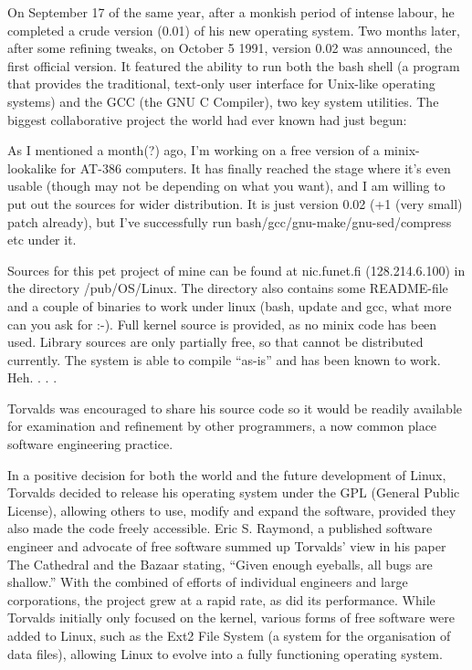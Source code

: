 \documentclass{article}
\begin{document}
On September 17 of the same year, after a monkish period of intense labour, he completed a crude version (0.01) of his new operating system. Two months later, after some refining tweaks, on October 5 1991, version 0.02 was announced, the first official version. It featured the ability to run both the bash shell (a program that provides the traditional, text-only user interface for Unix-like operating systems) and the GCC (the GNU C Compiler), two key system utilities. The biggest collaborative project the world had ever known had just begun: \newline 

As I mentioned a month(?) ago, I'm working on a free version of a minix-lookalike for AT-386 computers. It has finally reached the stage where it's even usable (though may not be depending on what you want), and I am willing to put out the sources for wider distribution. It is just version 0.02 (+1 (very small) patch already), but I've successfully run bash/gcc/gnu-make/gnu-sed/compress etc under it. 

Sources for this pet project of mine can be found at nic.funet.fi (128.214.6.100) in the directory /pub/OS/Linux. The directory also contains some README-file and a couple of binaries to work under linux (bash, update and gcc, what more can you ask for :-). Full kernel source is provided, as no minix code has been used. Library sources are only partially free, so that cannot be distributed currently. The system is able to compile ``as-is'' and has been known to work. Heh. . . . \cite{kernel} \newline 

Torvalds was encouraged to share his source code so it would be readily available for examination and refinement by other programmers, a now common place software engineering practice.  \newline \newline

In a positive decision for both the world and the future development of Linux, Torvalds decided to release his operating system under the GPL (General Public License), allowing others to use, modify and expand the software, provided they also made the code freely accessible. Eric S. Raymond, a published software engineer and advocate of free software summed up Torvalds’ view in his paper The Cathedral and the Bazaar stating, ``Given enough eyeballs, all bugs are shallow.''\cite{bazaar} With the combined of efforts of individual engineers and large corporations, the project grew at a rapid rate, as did its performance. While Torvalds initially only focused on the kernel, various forms of free software were added to Linux, such as the Ext2 File System (a system for the organisation of data files), allowing Linux to evolve into a fully functioning operating system.
\end{document}
